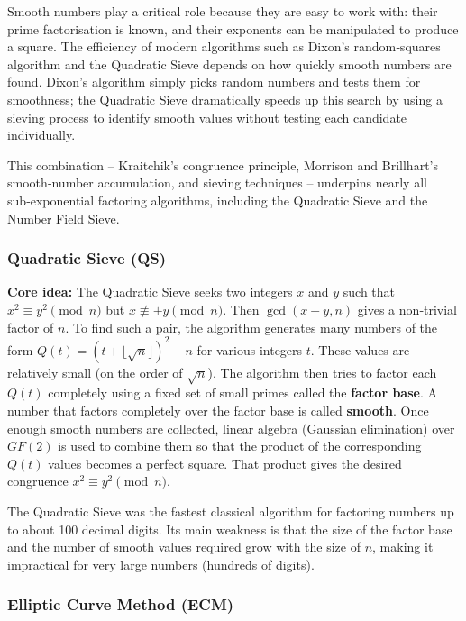 Smooth numbers play a critical role because they are easy to work with: their prime factorisation is known, and their exponents can be manipulated to produce a square. The efficiency of modern algorithms such as Dixon’s random‑squares algorithm and the Quadratic Sieve depends on how quickly smooth numbers are found. Dixon’s algorithm simply picks random numbers and tests them for smoothness; the Quadratic Sieve dramatically speeds up this search by using a sieving process to identify smooth values without testing each candidate individually.

This combination – Kraitchik’s congruence principle, Morrison and Brillhart’s smooth‑number accumulation, and sieving techniques – underpins nearly all sub‑exponential factoring algorithms, including the Quadratic Sieve and the Number Field Sieve.

\subsubsection{ Quadratic Sieve (QS)}

\textbf{Core idea:} The Quadratic Sieve seeks two integers \(x\) and \(y\) such that \(x^2 \equiv y^2 \pmod{n}\) but \(x \not\equiv \pm y \pmod{n}\). Then \(\gcd(x-y, n)\) gives a non‑trivial factor of \(n\). To find such a pair, the algorithm generates many numbers of the form \(Q(t) = (t + \lfloor\sqrt{n}\rfloor)^2 - n\) for various integers \(t\). These values are relatively small (on the order of \(\sqrt{n}\)). The algorithm then tries to factor each \(Q(t)\) completely using a fixed set of small primes called the \textbf{factor base}. A number that factors completely over the factor base is called \textbf{smooth}. Once enough smooth numbers are collected, linear algebra (Gaussian elimination) over \(GF(2)\) is used to combine them so that the product of the corresponding \(Q(t)\) values becomes a perfect square. That product gives the desired congruence \(x^2 \equiv y^2 \pmod{n}\).

The Quadratic Sieve was the fastest classical algorithm for factoring numbers up to about 100 decimal digits. Its main weakness is that the size of the factor base and the number of smooth values required grow with the size of \(n\), making it impractical for very large numbers (hundreds of digits).

\subsubsection{ Elliptic Curve Method (ECM)}

